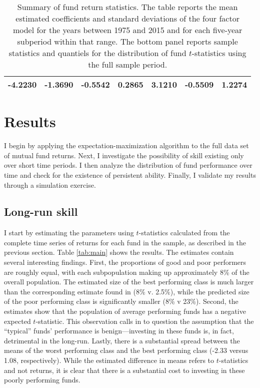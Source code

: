 \begin{table}[p]
\begin{tabular}{*{7}{c}}
		\midrule
		-4.2230 & -1.3690 & -0.5542 & 0.2865 & 3.1210 & -0.5509 & 1.2274 \\
		\bottomrule
		\end{tabular}
		\captionsetup{position=below, font=footnotesize, justification=justified, width=0.83\linewidth}
		\caption[Summary of fund return statistics]{Summary of fund return statistics. The table reports the mean estimated coefficients and standard deviations of the \citet{Carhart1997} four factor model for the years between 1975 and 2015 and for each five-year subperiod within that range. The bottom panel reports sample statistics and quantiels for the distribution of fund $t$-statistics using the full sample period.}
		\label{tab:summary}
	\end{table}


\section{Results}
	I begin by applying the expectation-maximization algorithm to the full data set of mutual fund returns. Next, I investigate the possibility of skill existing only over short time periods. I then analyze the distribution of fund performance over time and check for the existence of persistent ability. Finally, I validate my results through a simulation exercise.

	\subsection{Long-run skill}
		I start by estimating the parameters using $t$-statistics calculated from the complete time series of returns for each fund in the sample, as described in the previous section. Table \ref{tab:main} shows the results. The estimates contain several interesting findings.  First, the proportions of good and poor performers are roughly equal, with each subpopulation making up approximately 8\% of the overall population.  The estimated size of the best performing class is much larger than the corresponding estimate found in \citet{Barras2010} (8\% v. 2.5\%), while the predicted size of the poor performing class is significantly smaller (8\% v 23\%). Second, the estimates show that the population of average performing funds has a negative expected $t$-statistic.  This observation calls in to question the assumption that the ``typical'' funds' performance is benign---investing in these funds is, in fact, detrimental in the long-run.  Lastly, there is a substantial spread between the means of the worst performing class and the best performing class (-2.33 versus 1.08, respectively). While the estimated difference in means refers to $t$-statistics and not returns, it is clear that there is a substantial cost to investing in these poorly performing funds.

